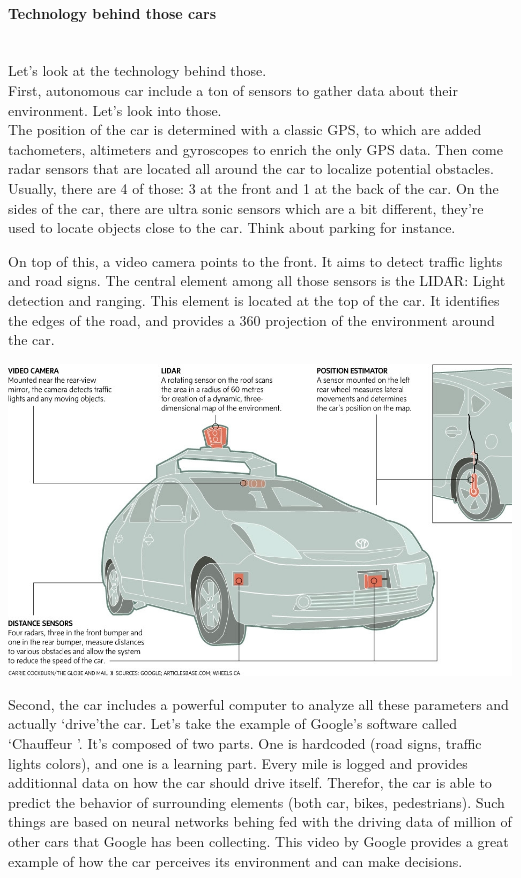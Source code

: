\documentclass[12pt]{article}
\begin{document}
\paragraph{Technology behind those cars}
\\
Let's look at the technology behind those.
\\
First, autonomous car include a ton of sensors to gather data about their
environment. Let's look into those.
\\
The position of the car is determined with a classic GPS, to which are added
tachometers, altimeters and gyroscopes to enrich the only GPS data. Then come
radar sensors that are located all around the car to localize potential
obstacles. Usually, there are 4 of those: 3 at the front and 1 at the back of
the car. On the sides of the car, there are ultra sonic sensors which are a bit
different, they're used to locate objects close to the car. Think about parking
for instance.

\noindent On top of this, a video camera points to the front. It aims to detect
traffic lights and road signs. The central element among all those sensors is
the LIDAR: Light detection and ranging. This element is located at the top of
the car. It identifies the edges of the road, and provides a 360 projection of
the environment around the car.

\vspace{5mm}
\includegraphics[width=\textwidth]{car-diagram}
\vspace{5mm}

Second, the car includes a powerful computer to analyze all these parameters
and actually \lq drive\rq the car. Let's take the example of Google's software
called \lq Chauffeur \rq . It's composed of two parts. One is hardcoded
(road signs, traffic lights colors), and one is a learning part. Every mile is
logged and provides additionnal data on how the car should drive itself.
Therefor, the car is able to predict the behavior of surrounding elements
(both car, bikes, pedestrians). Such things are based on neural networks behing
fed with the driving data of million of other cars
that Google has been collecting. This video by Google provides a great example
of how the car perceives its environment and can make decisions.
\end{document}
